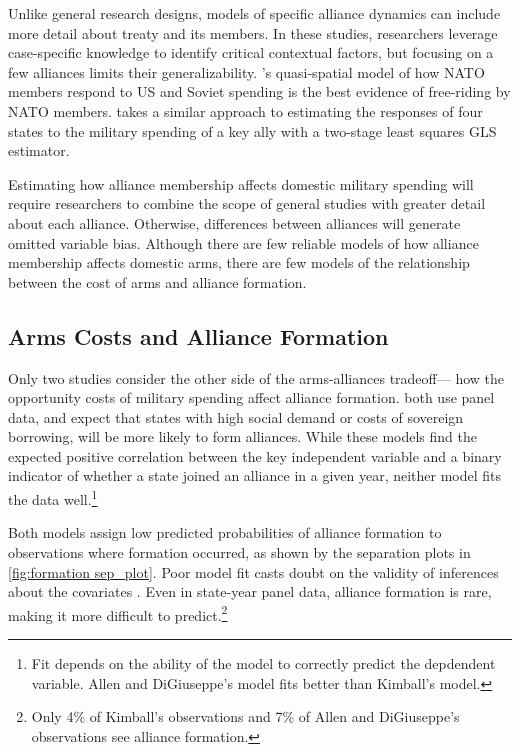 \documentclass[12pt]{article}
\begin{document}
Unlike general research designs, models of specific alliance dynamics can include more detail about treaty and its members. In these studies, researchers leverage case-specific knowledge to identify critical contextual factors, but focusing on a few alliances limits their generalizability. \citet{PluemperNeumayer2015}'s quasi-spatial model of how NATO members respond to US and Soviet spending is the best evidence of free-riding by NATO members. \citet{Sorokin1994} takes a similar approach to estimating the responses of four states to the military spending of a key ally with a two-stage least squares GLS estimator.

Estimating how alliance membership affects domestic military spending will require researchers to combine the scope of general studies with greater detail about each alliance. Otherwise, differences between alliances will generate omitted variable bias. Although there are few reliable models of how alliance membership affects domestic arms, there are few models of the relationship between the cost of arms and alliance formation. 

\subsection*{Arms Costs and Alliance Formation}

Only two studies consider the other side of the arms-alliances tradeoff--- how the opportunity costs of military spending affect alliance formation. \citet{Kimball2010, AllenDigiuseppe2013} both use panel data, and expect that states with high social demand or costs of sovereign borrowing, will be more likely to form alliances. While these models find the expected positive correlation between the key independent variable and a binary indicator of whether a state joined an alliance in a given year, neither model fits the data well.\footnote{Fit depends on the ability of the model to correctly predict the depdendent variable. Allen and DiGiuseppe's model fits better than Kimball's model.} 

Both models assign low predicted probabilities of alliance formation to observations where formation occurred, as shown by the separation plots in \autoref{fig:formation sep_plot}. Poor model fit casts doubt on the validity of inferences about the covariates \citep{Montgomeryetal2012, Muchlinskietal2015}. Even in state-year panel data, alliance formation is rare, making it more difficult to predict.\footnote{Only 4\% of Kimball's observations and 7\% of Allen and DiGiuseppe's observations see alliance formation.} 
\end{document}
